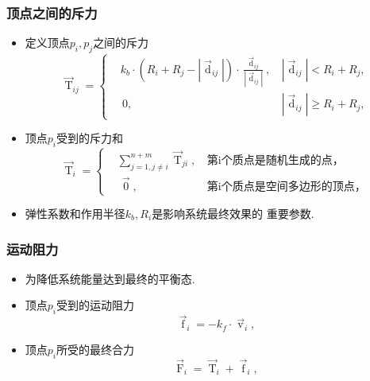 \documentclass[UTF8]{ctexbeamer}	%
\theoremstyle{plain}
\theoremstyle{definition}
\theoremstyle{remark}
\numberwithin{equation}{section}
\begin{document}
\begin{frame}
    \frametitle{顶点之间的斥力}
    \begin{itemize}
      \item 定义顶点$p_i, p_j$之间的斥力
      \begin{equation}
        \label{equ:Tij}
        {\mathop{T}\limits^{\rightarrow}}_{ij} =
        \left\{ \begin{aligned}
            &k_b \cdot \left( R_i + R_j - \left| {\mathop{d}\limits^{\rightarrow}}_{ij} \right| \right) \cdot \frac{{\mathop{d}\limits^{\rightarrow}}_{ij}}{\left| {\mathop{d}\limits^{\rightarrow}}_{ij} \right|},\, &\left| {\mathop{d}\limits^{\rightarrow}}_{ij} \right| <  R_i + R_j ,\\
            &\,0,&\left| {\mathop{d}\limits^{\rightarrow}}_{ij} \right| \ge  R_i + R_j
      ,    \end{aligned}\right.
      \end{equation}
        \item 顶点$p_i$受到的斥力和
        \begin{equation}
            \label{equ:Ti}
            {\mathop{T}\limits^{\rightarrow}}_{i} =
           \left\{ \begin{aligned}
                &{\sum\limits^{n+m}_{j=1,j\neq i}} {\mathop{T}\limits^{\rightarrow}}_{ji},\, &\text{第i个质点是随机生成的点，}\\
                &\,\mathop{0}\limits^{\rightarrow},&\text{第i个质点是空间多边形的顶点，}
             \end{aligned}\right.
          \end{equation}

          \item 弹性系数和作用半径$k_b, R_i$是影响系统最终效果的
          重要参数.
            \end{itemize}
\end{frame}

\begin{frame}
    \frametitle{运动阻力}
        \begin{itemize}
            \item 为降低系统能量达到最终的平衡态.
            \item 顶点$p_i$受到的运动阻力
            \begin{equation}
                \label{equ:fi}
              {\mathop{f}\limits^{\rightarrow}}_{i} = -k_f\cdot {\mathop{v}\limits^{\rightarrow}}_{i},
              \end{equation}

              \item 顶点$p_i$所受的最终合力 
              \begin{equation}
                \label{equ:Fi}
                {\mathop{F}\limits^{\rightarrow}}_{i} = {\mathop{T}\limits^{\rightarrow}}_{i} + {\mathop{f}\limits^{\rightarrow}}_{i},
              \end{equation}
        \end{itemize}
\end{frame}
\end{document}
